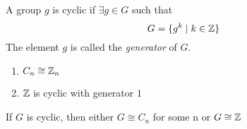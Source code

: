 \documentclass{article}
\begin{document}
\begin{defi}
    A group $g$ is cyclic if $\exists g \in G$ such that
    \[
        G = \{g^k \mid k \in \mathbb{Z}\}  
    \]
    The element $g$ is called the \emph{generator} of $G$.
\end{defi}

\begin{eg}\leavevmode
    \begin{enumerate}
        \item $C_n \cong \mathbb{Z}_n$
        \item $\mathbb{Z}$ is cyclic with generator $1$
    \end{enumerate}
\end{eg}

\begin{thm}
    If $G$ is cyclic, then either $G \cong C_n$ for some n or $G \cong \mathbb{Z}$
\end{thm}
\end{document}
